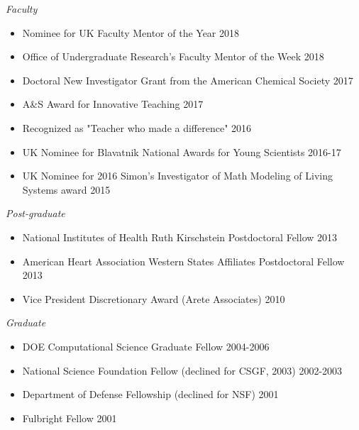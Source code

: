 \vspace{8pt} %



{\sl Faculty}
\begin{itemize} \itemsep -12pt %
\item  Nominee for UK Faculty Mentor of the Year \hfill 2018 \\
\item  Office of Undergraduate Research's Faculty Mentor of the Week \hfill 2018 \\
\item Doctoral New Investigator Grant from the American Chemical Society \hfill 2017\\
\item A\&S Award for Innovative Teaching \hfill 2017\\
\item Recognized as "Teacher who made a difference" \hfill 2016\\
\item UK Nominee for Blavatnik National Awards for Young Scientists \hfill 2016-17\\
\item UK Nominee for 2016 Simon's Investigator of Math
Modeling of Living Systems award \hfill 2015 \\
\end{itemize}

{\sl Post-graduate}
\begin{itemize} \itemsep -12pt %
\item National Institutes of Health Ruth Kirschstein Postdoctoral Fellow  \hfill 2013 \\
\item American Heart Association Western States Affiliates Postdoctoral
Fellow \hfill 2013 \\
\item Vice President Discretionary Award (Arete Associates)	\hfill 2010 \\
\end{itemize}

{\sl Graduate }
\begin{itemize} \itemsep -12pt %
\item DOE Computational Science Graduate Fellow	\hfill 2004-2006  \\
\item National Science Foundation Fellow (declined for CSGF, 2003)	\hfill 2002-2003 \\
\item Department of Defense Fellowship (declined for NSF)  \hfill 2001 \\
\item Fulbright Fellow	\hfill 2001 \\
\end{itemize}


